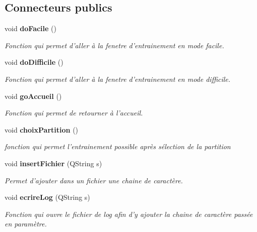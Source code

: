 \subsection*{Connecteurs publics}
\begin{DoxyCompactItemize}
\item 
void {\bf do\-Facile} ()\label{class_entrainement_page1_aee45c5abd549739198a42206db0eb869}

\begin{DoxyCompactList}\small\item\em Fonction qui permet d'aller à la fenetre d'entrainement en mode facile. \end{DoxyCompactList}\item 
void {\bf do\-Difficile} ()\label{class_entrainement_page1_a6d9fb6299b60a36569fe21202995fa20}

\begin{DoxyCompactList}\small\item\em Fonction qui permet d'aller à la fenetre d'entrainement en mode difficile. \end{DoxyCompactList}\item 
void {\bf go\-Accueil} ()\label{class_entrainement_page1_a27861dfdf502f6edae27f650cba4399c}

\begin{DoxyCompactList}\small\item\em Fonction qui permet de retourner à l'accueil. \end{DoxyCompactList}\item 
void {\bf choix\-Partition} ()\label{class_entrainement_page1_a5350caf23183fcd9e52b5ab06c738454}

\begin{DoxyCompactList}\small\item\em fonction qui permet l'entrainement possible après sélection de la partition \end{DoxyCompactList}\item 
void {\bf insert\-Fichier} (Q\-String s)
\begin{DoxyCompactList}\small\item\em Permet d'ajouter dans un fichier une chaine de caractère. \end{DoxyCompactList}\item 
void {\bf ecrire\-Log} (Q\-String s)
\begin{DoxyCompactList}\small\item\em Fonction qui ouvre le fichier de log afin d'y ajouter la chaine de caractère passée en paramètre. \end{DoxyCompactList}\end{DoxyCompactItemize}

